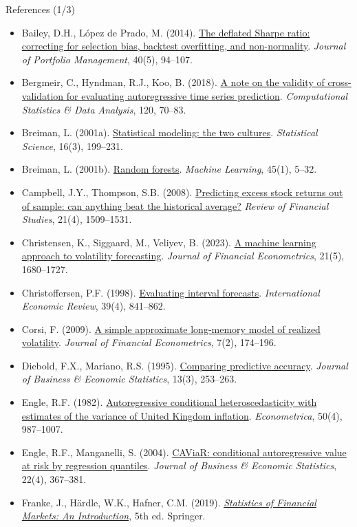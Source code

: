 \begin{frame}{References (1/3)}
\itemsize{\tiny}
\begin{itemize}
    \item Bailey, D.H., López de Prado, M. (2014). \href{https://doi.org/10.3905/jpm.2014.40.5.094}{The deflated Sharpe ratio: correcting for selection bias, backtest overfitting, and non-normality}. \textit{Journal of Portfolio Management}, 40(5), 94--107.
    \item Bergmeir, C., Hyndman, R.J., Koo, B. (2018). \href{https://doi.org/10.1016/j.csda.2017.11.003}{A note on the validity of cross-validation for evaluating autoregressive time series prediction}. \textit{Computational Statistics \& Data Analysis}, 120, 70--83.
    \item Breiman, L. (2001a). \href{https://doi.org/10.1214/ss/1009213726}{Statistical modeling: the two cultures}. \textit{Statistical Science}, 16(3), 199--231.
    \item Breiman, L. (2001b). \href{https://doi.org/10.1023/A:1010933404324}{Random forests}. \textit{Machine Learning}, 45(1), 5--32.
    \item Campbell, J.Y., Thompson, S.B. (2008). \href{https://doi.org/10.1093/rfs/hhm055}{Predicting excess stock returns out of sample: can anything beat the historical average?} \textit{Review of Financial Studies}, 21(4), 1509--1531.
    \item Christensen, K., Siggaard, M., Veliyev, B. (2023). \href{https://doi.org/10.1093/jjfinec/nbac020}{A machine learning approach to volatility forecasting}. \textit{Journal of Financial Econometrics}, 21(5), 1680--1727.
    \item Christoffersen, P.F. (1998). \href{https://doi.org/10.2307/2527341}{Evaluating interval forecasts}. \textit{International Economic Review}, 39(4), 841--862.
    \item Corsi, F. (2009). \href{https://doi.org/10.1093/jjfinec/nbp001}{A simple approximate long-memory model of realized volatility}. \textit{Journal of Financial Econometrics}, 7(2), 174--196.
    \item Diebold, F.X., Mariano, R.S. (1995). \href{https://doi.org/10.1080/07350015.1995.10524599}{Comparing predictive accuracy}. \textit{Journal of Business \& Economic Statistics}, 13(3), 253--263.
    \item Engle, R.F. (1982). \href{https://doi.org/10.2307/1912773}{Autoregressive conditional heteroscedasticity with estimates of the variance of United Kingdom inflation}. \textit{Econometrica}, 50(4), 987--1007.
    \item Engle, R.F., Manganelli, S. (2004). \href{https://doi.org/10.1198/073500104000000370}{CAViaR: conditional autoregressive value at risk by regression quantiles}. \textit{Journal of Business \& Economic Statistics}, 22(4), 367--381.
    \item Franke, J., Härdle, W.K., Hafner, C.M. (2019). \href{https://doi.org/10.1007/978-3-030-13751-9}{\textit{Statistics of Financial Markets: An Introduction}}, 5th ed. Springer.
\end{itemize}
\end{frame}

